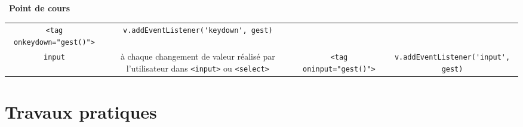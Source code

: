 \documentclass[
  11pt,
]{article}
\newcommand{\passthrough}[1]{#1}
\newcounter{cours}
\newenvironment{cours}[1]
{\par \medskip   \addtocounter{cours}{1} \noindent  
\begin{bclogo}[arrondi =0.1,  ombre = true, barre=none, logo=\bcbook, marge=4]{~\textbf{Point de cours} \textbf{\thecours} {\itshape #1} }  \par}
{
\end{bclogo}
 \par \bigskip }
\begin{document}
\begin{cours}{}
\begin{longtable}[]{@{}cccc@{}}
\begin{minipage}[t]{0.22\columnwidth}
\passthrough{\lstinline!<tag   onkeydown="gest()">!}\strut
\end{minipage} & \begin{minipage}[t]{0.22\columnwidth}\centering
\passthrough{\lstinline!v.addEventListener('keydown', gest)!}\strut
\end{minipage}\tabularnewline
\begin{minipage}[t]{0.22\columnwidth}\centering
\passthrough{\lstinline!input!}\strut
\end{minipage} & \begin{minipage}[t]{0.22\columnwidth}\centering
à chaque changement de valeur réalisé par l'utilisateur dans
\passthrough{\lstinline!<input>!} ou
\passthrough{\lstinline!<select>!}\strut
\end{minipage} & \begin{minipage}[t]{0.22\columnwidth}\centering
\passthrough{\lstinline!<tag      oninput="gest()">!}\strut
\end{minipage} & \begin{minipage}[t]{0.22\columnwidth}\centering
\passthrough{\lstinline!v.addEventListener('input', gest)!}\strut
\end{minipage}\tabularnewline
\bottomrule
\end{longtable}

\end{cours}

\hypertarget{travaux-pratiques}{%
\section{Travaux pratiques}\label{travaux-pratiques}}
\end{document}
